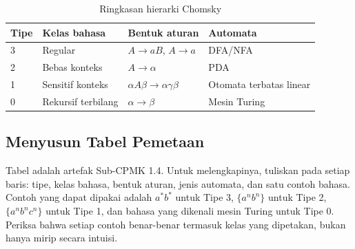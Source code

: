 \begin{table}[H]
\centering
\caption{Ringkasan hierarki Chomsky}
\label{tab:ch04-ringkasan}
\begin{tabularx}{\textwidth}{@{}l l X l@{}}
\toprule
\textbf{Tipe} & \textbf{Kelas bahasa} & \textbf{Bentuk aturan} &
\textbf{Automata} \\
\midrule
3 & Regular & \(A \to aB\), \(A \to a\) & DFA/NFA \\
2 & Bebas konteks & \(A \to \alpha\) & PDA \\
1 & Sensitif konteks & \(\alpha A\beta \to \alpha\gamma\beta\) &
Otomata terbatas linear \\
0 & Rekursif terbilang & \(\alpha \to \beta\) & Mesin Turing \\
\bottomrule
\end{tabularx}
\end{table}

\subsection{Menyusun Tabel Pemetaan}

Tabel  adalah artefak Sub-CPMK 1.4. Untuk
melengkapinya, tuliskan pada setiap baris: tipe, kelas bahasa, bentuk
aturan, jenis automata, dan satu contoh bahasa. Contoh yang dapat
dipakai adalah \(a^{*}b^{*}\) untuk Tipe 3, \(\{a^n b^n\}\) untuk
Tipe 2, \(\{a^n b^n c^n\}\) untuk Tipe 1, dan bahasa yang dikenali
mesin Turing untuk Tipe 0. Periksa bahwa setiap contoh benar-benar
termasuk kelas yang dipetakan, bukan hanya mirip secara intuisi.
